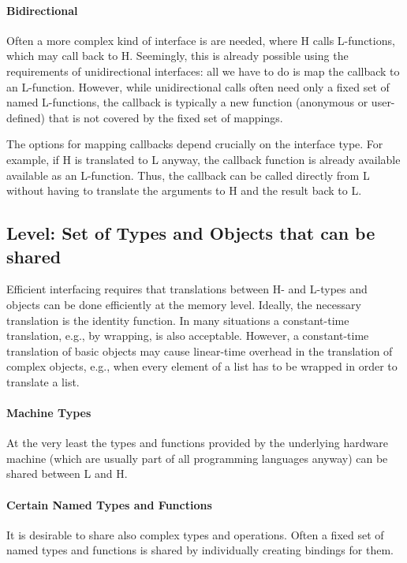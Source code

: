\paragraph{Bidirectional}
Often a more complex kind of interface is are needed, where H calls L-functions, which may call back to H.
Seemingly, this is already possible using the requirements of unidirectional interfaces: all we have to do is map the callback to an L-function.
However, while unidirectional calls often need only a fixed set of named L-functions, the callback is typically a new function (anonymous or user-defined) that is not covered by the fixed set of mappings.

The options for mapping callbacks depend crucially on the interface type.
For example, if H is translated to L anyway, the callback function is already available available as an L-function.
Thus, the callback can be called directly from L without having to translate the arguments to H and the result back to L.


\subsection{Level: Set of Types and Objects that can be shared}

Efficient interfacing requires that translations between H- and L-types and objects can be done efficiently at the memory level.
Ideally, the necessary translation is the identity function.
In many situations a constant-time translation, e.g., by wrapping, is also acceptable.
However, a constant-time translation of basic objects may cause linear-time overhead in the translation of complex objects, e.g., when every element of a list has to be wrapped in order to translate a list.

\paragraph{Machine Types}
At the very least the types and functions provided by the underlying hardware machine (which are usually part of all programming languages anyway) can be shared between L and H.

\paragraph{Certain Named Types and Functions}
It is desirable to share also complex types and operations.
Often a fixed set of named types and functions is shared by individually creating bindings for them.

